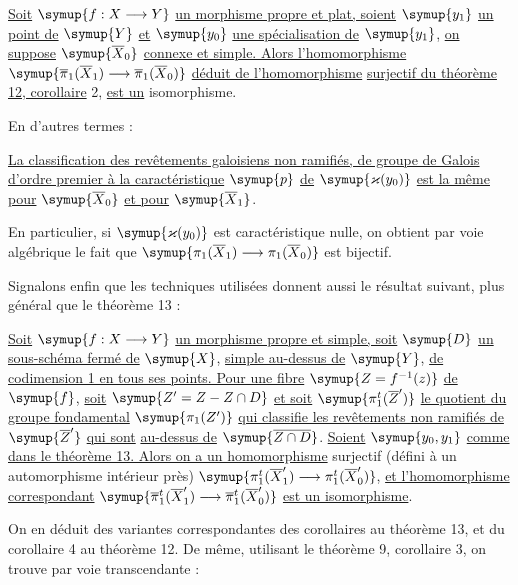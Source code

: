  \uline{Soit} $\symup{f:X\longrightarrow Y}$ \uline{un morphisme propre et plat,
soient} $\symup{y_1}$ \uline{un point de} $\symup{Y}$ \uline{et} $\symup{y_0}$ \uline{une spécialisation de} $\symup{y_1}$, \uline{on suppose}
$\symup{\overline X_0}$ \uline{connexe et simple. Alors l'homomorphisme}
$\symup{\overline\pi_1(\overline X_1)\longrightarrow
\overline\pi_1(\overline X_0)}$ \uline{déduit de l'homomorphisme} 
\uline{surjectif du
théorème 12, corollaire} 2, \uline{est un} isomorphisme.

En d'autres termes :

 \uline{La classification des revêtements galoisiens non
ramifiés, de groupe de Galois d'ordre premier à la caractéristique} $\symup{p}$ \uline{de}
$\symup{\varkappa(y_0)}$ \uline{est la même pour} $\symup{\overline X_0}$ \uline{et pour} $\symup{\overline X_1}$.

En particulier, si $\symup{\varkappa(y_0)}$ est caractéristique nulle, on obtient par
voie algébrique le fait que
$\symup{\pi_1(\overline X_1)\longrightarrow\pi_1(\overline X_0)}$ est bijectif.

Signalons enfin que les techniques utilisées donnent aussi le résultat
suivant, plus général que le théorème 13 :

 \uline{Soit} $\symup{f:X\longrightarrow Y}$ \uline{un morphisme propre et
simple, soit} $\symup{D}$ \uline{un sous-schéma fermé de} $\symup{X}$, \uline{simple au-dessus de} $\symup{Y}$, \uline{de
codimension 1 en tous ses points. Pour une fibre} $\symup{Z=f^{-1}(z)}$ \uline{de} $\symup{f}$, \uline{soit}
$\symup{Z'=Z-Z\cap D}$ \uline{et soit} $\symup{\pi_1^t(\overline Z')}$ \uline{le quotient du groupe fondamental}
$\symup{\pi_1(Z')}$ \uline{qui classifie les revêtements non ramifiés de} $\symup{\overline Z'}$ \uline{qui sont}
\uline{} \uline{au-dessus de} $\symup{\overline{Z\cap D}}$. \uline{Soient} $\symup{y_0,y_1}$ \uline{comme
dans le théorème 13. Alors on a un homomorphisme} surjectif (défini à un
automorphisme intérieur près)
$\symup{\pi_1^t(\overline X'_1)\longrightarrow\pi_1^t(\overline X'_0)}$,
\uline{et l'homomorphisme correspondant}
$\symup{\overline\pi_1^t(\overline X'_1)
  \longrightarrow\overline\pi_1^t(\overline X'_0)}$
\uline{est un isomorphisme}.

On en déduit des variantes correspondantes des corollaires au théorème 13, et
du corollaire 4 au théorème 12. De même, utilisant le théorème 9, corollaire 3,
on trouve par voie transcendante :

